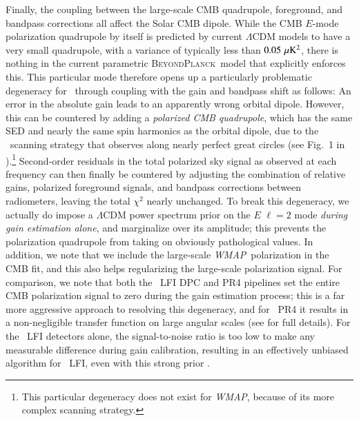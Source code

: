 \documentclass[twocolumn]{aa}
\def\WMAP{\textit{WMAP}}
\newcommand{\BP}{\textsc{BeyondPlanck}}
\begin{document}
Finally, the coupling between the large-scale CMB quadrupole,
foreground, and bandpass corrections all affect the Solar CMB
dipole. While the CMB $E$-mode polarization quadrupole by itself is
predicted by current $\Lambda$CDM models to have a very small
quadrupole, with a variance of typically less than $0.05\,\muK^2$,
there is nothing in the current parametric \BP\ model that explicitly
enforces this. This particular mode therefore opens up a particularly
problematic degeneracy for \Planck\ through coupling with the gain and
bandpass shift as follows: An error in the absolute gain leads to an
apparently wrong orbital dipole. However, this can be countered by
adding a \emph{polarized CMB quadrupole}, which has the same SED and
nearly the same spin harmonics as the orbital dipole, due to the
\Planck\ scanning strategy that observes along nearly perfect great
circles  (see Fig.~1 in \citet{bp07}).\footnote{This particular
  degeneracy does not exist for \WMAP, because of its more complex
  scanning strategy.}  Second-order residuals in the total polarized
sky signal as observed at each frequency can then finally be countered
by adjusting the combination of relative gains, polarized foreground
signals, and bandpass corrections between radiometers, leaving the
total $\chi^2$ nearly unchanged. To break this degeneracy, we actually
do impose a $\Lambda$CDM power spectrum prior on the $E$ $\ell=2$ mode
\emph{during gain estimation alone}, and marginalize over its
amplitude; this prevents the polarization quadrupole from taking on
obviously pathological values. In addition, we note that we include
the large-scale \WMAP\ polarization in the CMB fit, and this also
helps regularizing the large-scale polarization signal. For
comparison, we note that both the \Planck\ LFI DPC and PR4 pipelines
set the entire CMB polarization signal to zero during the gain
estimation process; this is a far more aggressive approach to
resolving this degeneracy, and for \Planck\ PR4 it results in a
non-negligible transfer function on large angular scales (see
\citep{npipe} for full details). For the \Planck\ LFI detectors alone,
the signal-to-noise ratio is too low to make any measurable difference
during gain calibration, resulting in an effectively unbiased
algorithm for \Planck\ LFI, even with this strong prior
\citep{planck2014-a04}.
\end{document}
